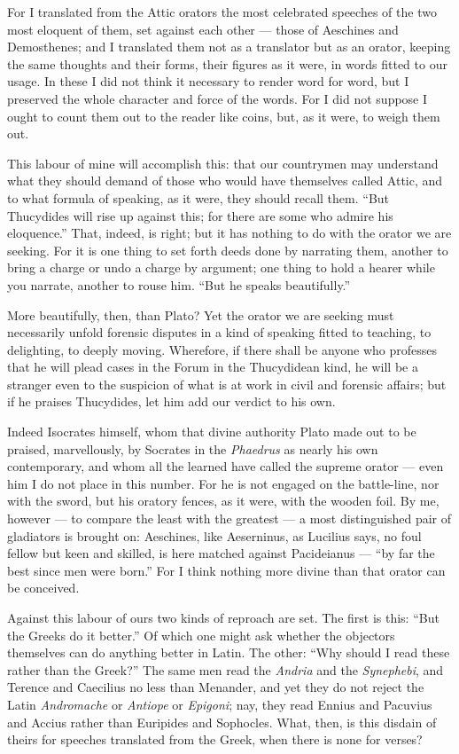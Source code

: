  For I translated from the Attic orators the most celebrated speeches of the two most eloquent of them, set against each other --- those of Aeschines and Demosthenes; and I translated them not as a translator but as an orator, keeping the same thoughts and their forms, their figures as it were, in words fitted to our usage. In these I did not think it necessary to render word for word, but I preserved the whole character and force of the words. For I did not suppose I ought to count them out to the reader like coins, but, as it were, to weigh them out.

 This labour of mine will accomplish this: that our countrymen may understand what they should demand of those who would have themselves called Attic, and to what formula of speaking, as it were, they should recall them. ``But Thucydides will rise up against this; for there are some who admire his eloquence.'' That, indeed, is right; but it has nothing to do with the orator we are seeking. For it is one thing to set forth deeds done by narrating them, another to bring a charge or undo a charge by argument; one thing to hold a hearer while you narrate, another to rouse him. ``But he speaks beautifully.''

 More beautifully, then, than Plato? Yet the orator we are seeking must necessarily unfold forensic disputes in a kind of speaking fitted to teaching, to delighting, to deeply moving. Wherefore, if there shall be anyone who professes that he will plead cases in the Forum in the Thucydidean kind, he will be a stranger even to the suspicion of what is at work in civil and forensic affairs; but if he praises Thucydides, let him add our verdict to his own.

 Indeed Isocrates himself, whom that divine authority Plato made out to be praised, marvellously, by Socrates in the \textit{Phaedrus} as nearly his own contemporary, and whom all the learned have called the supreme orator --- even him I do not place in this number. For he is not engaged on the battle-line, nor with the sword, but his oratory fences, as it were, with the wooden foil. By me, however --- to compare the least with the greatest --- a most distinguished pair of gladiators is brought on: Aeschines, like Aeserninus, as Lucilius says, no foul fellow but keen and skilled, is here matched against Pacideianus --- ``by far the best since men were born.'' For I think nothing more divine than that orator can be conceived.

 Against this labour of ours two kinds of reproach are set. The first is this: ``But the Greeks do it better.'' Of which one might ask whether the objectors themselves can do anything better in Latin. The other: ``Why should I read these rather than the Greek?'' The same men read the \textit{Andria} and the \textit{Synephebi}, and Terence and Caecilius no less than Menander, and yet they do not reject the Latin \textit{Andromache} or \textit{Antiope} or \textit{Epigoni}; nay, they read Ennius and Pacuvius and Accius rather than Euripides and Sophocles. What, then, is this disdain of theirs for speeches translated from the Greek, when there is none for verses?

